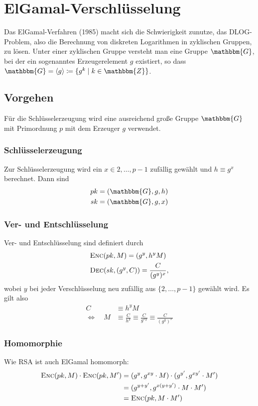 \section{ElGamal-Verschlüsselung}
\label{ch:asymenc:elgamal} Das ElGamal-Verfahren \indexElGamal (1985)
macht sich die Schwierigkeit zunutze, das DLOG-Problem\indexDLOGProblem,
also die Berechnung von diskreten Logarithmen in zyklischen Gruppen, zu
lösen. Unter einer zyklischen Gruppe versteht man eine Gruppe
$\mathbbm{G}$, bei der ein sogenanntes Erzeugerelement $g$ existiert, so
dass $\mathbbm{G} = \langle g \rangle \coloneqq \{g^k \mid k \in
\mathbbm{Z}\}$.

\subsection{Vorgehen} Für die Schlüsselerzeugung wird eine ausreichend
große Gruppe $\mathbbm{G}$ mit Primordnung $p$ mit dem Erzeuger $g$
verwendet.
\subsubsection{Schlüsselerzeugung} Zur Schlüsselerzeugung wird ein $x
\in {2,\dots, p-1}$ zufällig gewählt und $h \equiv g^x$ berechnet. Dann
sind
\begin{align*} 
  pk &= (\mathbbm{G}, g, h)\\ sk &= (\mathbbm{G}, g, x)
\end{align*}

\subsubsection{Ver- und Entschlüsselung} Ver- und Entschlüsselung sind
definiert durch
\begin{align*} 
&\textsc{Enc}(pk, M) = (g^y, h^y M) \\ 
&\textsc{Dec}(sk, (g^y, C)) = \frac{C}{(g^y)^x},
\end{align*} 
wobei $y$ bei jeder Verschlüsselung neu zufällig aus $\{2, \dots, p-1\}$
gewählt wird. Es gilt also 
\begin{align*} 
C &\equiv h^y M \\ 
\Leftrightarrow \quad M& \equiv \frac{C}{h^y} \equiv \frac{C}{g^{xy}}
                         \equiv \frac{C}{(g^y)^x} 
\end{align*}

\subsubsection{Homomorphie}\indexElGamalHomomorphie Wie RSA ist auch
ElGamal homomorph:
\begin{align*} 
\textsc{Enc}({pk,M}) \cdot \textsc{Enc}({pk,M'}) &= (g^y, g^{xy} \cdot M)\cdot (g^{y'},
                                   g^{xy'} \cdot M')\\ 
                                 &= (g^{y+y'}, g^{x(y + y')}\cdot M  \cdot M')\\ 
                                 &= \textsc{Enc}({pk, M \cdot M'})
\end{align*}

